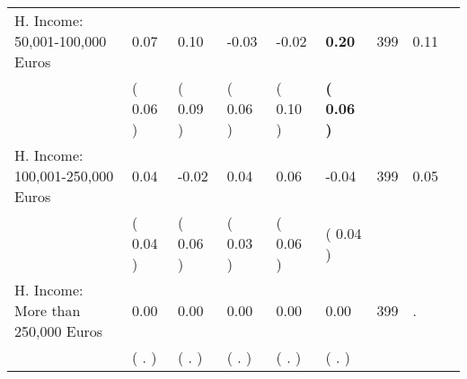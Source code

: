 \begin{tabular}{L{6.2cm} C{1.8cm} C{1.8cm} C{1.8cm} C{1.8cm} C{1.8cm} C{1.8cm} C{0.3cm} C{0.3cm}}
H. Income: 50,001-100,000 Euros &      0.07 &      0.10 &     -0.03 &     -0.02 & \textbf{     0.20}  & 399 &       0.11 \\ 
 & (     0.06 ) & (     0.09 ) & (     0.06 ) & (     0.10 ) & \textbf{(     0.06 )}  & \\
H. Income: 100,001-250,000 Euros &      0.04 &     -0.02 &      0.04 &      0.06 &     -0.04  & 399 &       0.05 \\ 
 & (     0.04 ) & (     0.06 ) & (     0.03 ) & (     0.06 ) & (     0.04 )  & \\
H. Income: More than 250,000 Euros &      0.00 &      0.00 &      0.00 &      0.00 &      0.00  & 399 &          . \\ 
 & (        . ) & (        . ) & (        . ) & (        . ) & (        . )  & \\
\bottomrule
\end{tabular}
